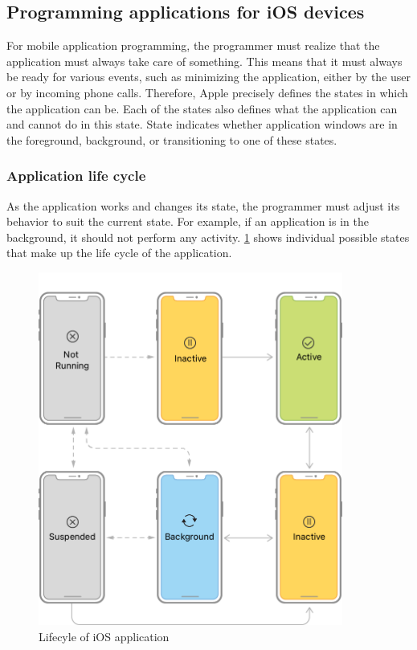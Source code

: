 \documentclass[
  biblatex,
  language=english,
  figures=false,
  sourcecodes,
  glossaries,
  index
]{kidiplom}
\begin{document}
\subsection{Programming applications for iOS devices}
For mobile application programming, the programmer must realize that the application must always take care of something. This means that it must always be ready for various events, such as minimizing the application, either by the user or by incoming phone calls. Therefore, Apple precisely defines the states in which the application can be. Each of the states also defines what the application can and cannot do in this state. State indicates whether application windows are in the foreground, background, or transitioning to one of these states.

\subsubsection{Application life cycle}
As the application works and changes its state, the programmer must adjust its behavior to suit the current state. For example, if an application is in the background, it should not perform any activity. \ref{fig:image2} shows individual possible states that make up the life cycle of the application\cite{bib4}.

\begin{figure}[h]
\centering
\includegraphics[width=10cm]{image2}
\caption{Lifecyle of iOS application}
\label{fig:image2}
\end{figure}
\end{document}
